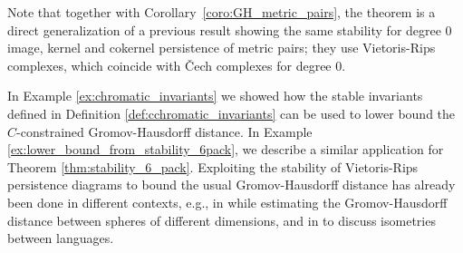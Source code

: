 \documentclass[8pt,a4paper,oneside,english,english]{article}
\theoremstyle{plain}
\theoremstyle
{plain}
\theoremstyle{definition}
\begin{document}
Note that together with Corollary~\ref{coro:GH_metric_pairs}, the theorem is a direct generalization of a previous result \cite[Proposition~2.4]{TorGon} showing the same stability for degree 0 image, kernel and cokernel persistence of metric pairs; they use Vietoris-Rips complexes, which coincide with \v{Cech} complexes for degree 0.

In Example \ref{ex:chromatic_invariants} we showed how the stable invariants defined in Definition \ref{def:cchromatic_invariants} can be used to lower bound the $C$-constrained Gromov-Hausdorff distance. In Example \ref{ex:lower_bound_from_stability_6pack}, we describe a similar application for Theorem \ref{thm:stability_6_pack}. Exploiting the stability of Vietoris-Rips persistence diagrams to bound the usual Gromov-Hausdorff distance has already been done in different contexts, e.g., in \cite{LimMemOku} while estimating the Gromov-Hausdorff distance between spheres of different dimensions, and in \cite{PatMonGarGorNeu} to discuss isometries between languages.
\end{document}
